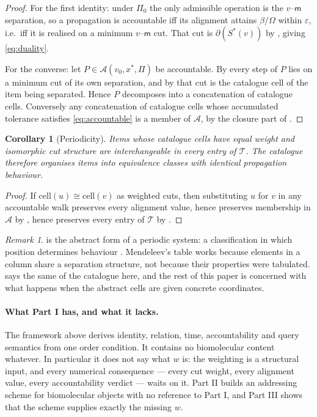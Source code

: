 \documentclass[11pt,twocolumn,a4paper]{article}
\theoremstyle{thmstyle}
\newtheorem{corollary}[theorem]{Corollary}
\theoremstyle{definition}
\theoremstyle{remark}
\newtheorem{remark}[theorem]{Remark}
\newcommand{\wt}{w}
\newcommand{\med}{\mathsf{m}}
\newcommand{\flo}{\beta}
\newcommand{\cut}{\partial}
\newcommand{\acc}{\mathcal{A}}
\newcommand{\Proc}{\Pi}
\newcommand{\Tab}{\mathcal{T}}
\newcommand{\eps}{\varepsilon}
\begin{document}
\begin{proof}
For the first identity: under $\Proc_0$ the only admissible operation
is the $v$--$\med$ separation, so a propagation is accountable iff its
alignment attains $\flo/\Omega$ within $\eps$, i.e.\ iff it is
realised on a minimum $v$--$\med$ cut. That cut is $\cut(S^{*}(v))$ by
, giving \eqref{eq:duality}.

For the converse: let $P \in \acc(v_0,x^{*},\Proc)$ be accountable.
By  every step of $P$ lies on a minimum cut of
its own separation, and by  that cut is the
catalogue cell of the item being separated. Hence $P$ decomposes into
a concatenation of catalogue cells. Conversely any concatenation of
catalogue cells whose accumulated tolerance satisfies
\eqref{eq:accountable} is a member of $\acc$, by the closure part of
.
\end{proof}

\begin{corollary}[Periodicity]
\label{cor:periodic}
Items whose catalogue cells have equal weight and isomorphic cut
structure are interchangeable in every entry of $\Tab$. The catalogue
therefore organises items into equivalence classes with identical
propagation behaviour.
\end{corollary}

\begin{proof}
If $\mathrm{cell}(u) \cong \mathrm{cell}(v)$ as weighted cuts, then
substituting $u$ for $v$ in any accountable walk preserves every
alignment value, hence preserves membership in $\acc$ by
, hence preserves every entry of $\Tab$ by
.
\end{proof}

\begin{remark}
 is the abstract form of a periodic system: a
classification in which position determines behaviour
\citep{mendeleev1869,scerri2007}. Mendeleev's table works because
elements in a column share a separation structure, not because their
properties were tabulated.  says the same of
the catalogue here, and the rest of this paper is concerned with what
happens when the abstract cells are given concrete coordinates.
\end{remark}

\paragraph{What Part I has, and what it lacks.}
The framework above derives identity, relation, time, accountability
and query semantics from one order condition. It contains no
biomolecular content whatever. In particular it does not say what
$\wt$ is: the weighting is a structural input, and every numerical
consequence --- every cut weight, every alignment value, every
accountability verdict --- waits on it. Part II builds an addressing
scheme for biomolecular objects with no reference to Part I, and
Part III shows that the scheme supplies exactly the missing $\wt$.
\end{document}
